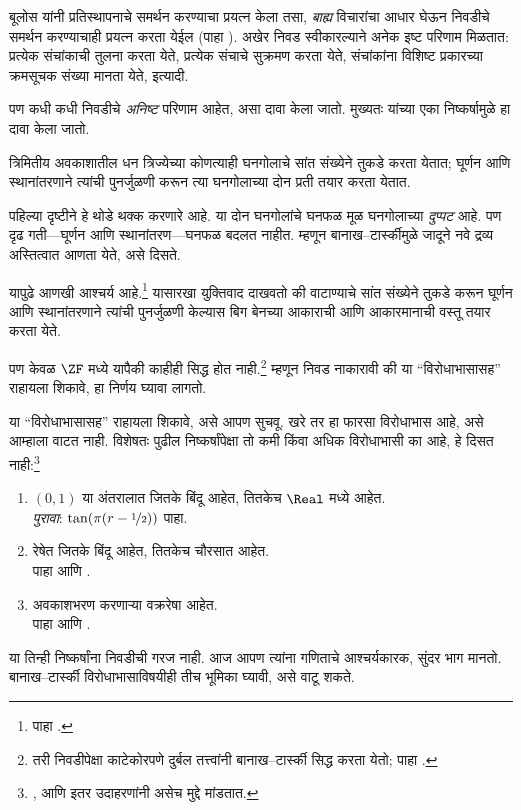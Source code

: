\documentclass[../../../include/open-logic-section]{subfiles}
\begin{document}

बूलोस यांनी प्रतिस्थापनाचे समर्थन करण्याचा प्रयत्न केला तसा, \emph{बाह्य} विचारांचा आधार घेऊन निवडीचे समर्थन करण्याचाही प्रयत्न करता येईल (पाहा ). अखेर निवड स्वीकारल्याने अनेक इष्ट परिणाम मिळतात: प्रत्येक संचांकाची तुलना करता येते, प्रत्येक संचाचे सुक्रमण करता येते, संचांकांना विशिष्ट प्रकारच्या क्रमसूचक संख्या मानता येते, इत्यादी.

पण कधी कधी निवडीचे \emph{अनिष्ट} परिणाम आहेत, असा दावा केला जातो. मुख्यतः \cite{BanachTarski1924} यांच्या एका निष्कर्षामुळे हा दावा केला जातो.

\begin{thm}[बानाख--टार्स्की विरोधाभास ($\ZFC$ मध्ये)]
त्रिमितीय अवकाशातील धन त्रिज्येच्या कोणत्याही घनगोलाचे सांत संख्येने तुकडे करता येतात; घूर्णन आणि स्थानांतरणाने त्यांची पुनर्जुळणी करून त्या घनगोलाच्या दोन प्रती तयार करता येतात.
\end{thm}
\noindent
पहिल्या दृष्टीने हे थोडे थक्क करणारे आहे. या दोन घनगोलांचे घनफळ मूळ घनगोलाच्या \emph{दुप्पट} आहे. पण दृढ गती---घूर्णन आणि स्थानांतरण---घनफळ बदलत नाहीत. म्हणून बानाख--टार्स्कीमुळे जादूने नवे द्रव्य अस्तित्वात आणता येते, असे दिसते.

यापुढे आणखी आश्चर्य आहे.\footnote{पाहा \citet[प्रमेय 3.12]{Wagon2016}.} यासारखा युक्तिवाद दाखवतो की वाटाण्याचे सांत संख्येने तुकडे करून घूर्णन आणि स्थानांतरणाने त्यांची पुनर्जुळणी केल्यास बिग बेनच्या आकाराची आणि आकारमानाची वस्तू तयार करता येते.

पण केवळ $\ZF$ मध्ये यापैकी काहीही सिद्ध होत नाही.\footnote{तरी निवडीपेक्षा काटेकोरपणे दुर्बल तत्त्वांनी बानाख--टार्स्की सिद्ध करता येतो; पाहा \citet[303]{Wagon2016}.} म्हणून निवड नाकारावी की या “विरोधाभासासह” राहायला शिकावे, हा निर्णय घ्यावा लागतो.

या “विरोधाभासासह” राहायला शिकावे, असे आपण सुचवू. खरे तर हा फारसा विरोधाभास आहे, असे आम्हाला वाटत नाही. विशेषतः पुढील निष्कर्षांपेक्षा तो कमी किंवा अधिक विरोधाभासी का आहे, हे दिसत नाही:\footnote{\citet[276--7]{Potter2004}, \citet[16]{Weston2003} आणि \citet[31, 308--9]{Wagon2016} इतर उदाहरणांनी असेच मुद्दे मांडतात.}
\begin{enumerate}
	\item $(0,1)$ या अंतरालात जितके बिंदू आहेत, तितकेच $\Real$ मध्ये आहेत.
	\\\emph{पुरावा}: $\tan(\pi(r-\nicefrac{1}{2}))$ पाहा.
	\item रेषेत जितके बिंदू आहेत, तितकेच चौरसात आहेत.
	\\पाहा  आणि .
	\item अवकाशभरण करणाऱ्या वक्ररेषा आहेत.
	\\पाहा  आणि .
\end{enumerate}
या तिन्ही निष्कर्षांना निवडीची गरज नाही. आज आपण त्यांना गणिताचे आश्चर्यकारक, सुंदर भाग मानतो. बानाख--टार्स्की विरोधाभासाविषयीही तीच भूमिका घ्यावी, असे वाटू शकते.
\end{document}
